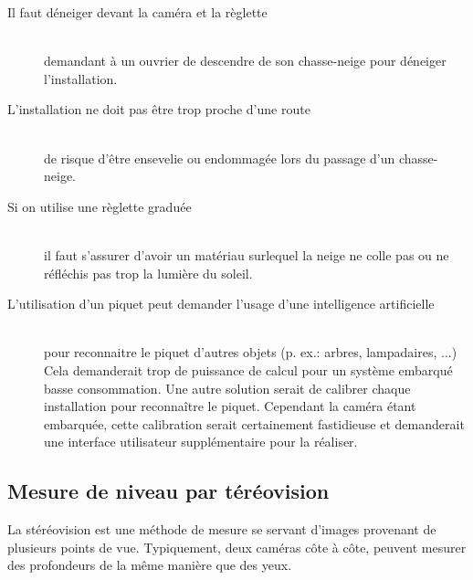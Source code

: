 \begin{description}
    \item[Il faut déneiger devant la caméra et la règlette] \hfill \\
    demandant à un ouvrier de descendre de son chasse-neige pour déneiger l'installation.
    \item[L'installation ne doit pas être trop proche d'une route] \hfill \\ 
    de risque d'être ensevelie ou endommagée lors du passage d'un chasse-neige.
    \item[Si on utilise une règlette graduée] \hfill \\ 
    il faut s'assurer d'avoir un matériau surlequel la neige ne colle pas ou 
    ne réfléchis pas trop la lumière du soleil.
    \item[L'utilisation d'un piquet peut demander l'usage d'une intelligence artificielle \cite{SnowTimeLapse}] \hfill \\
    pour reconnaitre le piquet d'autres objets (p. ex.: arbres, lampadaires, ...)
    Cela demanderait trop de puissance de calcul pour un système embarqué basse consommation.
    Une autre solution serait de calibrer chaque installation pour reconnaître le piquet.
    Cependant la caméra étant embarquée, cette calibration serait certainement
    fastidieuse et demanderait une interface utilisateur supplémentaire pour la réaliser.
\end{description}
\newpage

\subsection{Mesure de niveau par téréovision}
La stéréovision est une méthode de mesure se servant d'images provenant de plusieurs points de vue.
Typiquement, deux caméras côte à côte, peuvent mesurer des profondeurs de la même manière que des yeux.

